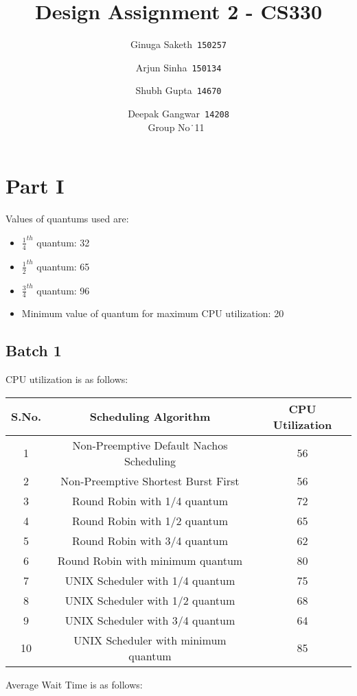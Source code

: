\documentclass[]{article}
\title{Design Assignment 2 - CS330}
\author{
  Ginuga Saketh\      \texttt{150257}
  \and
  Arjun Sinha\      \texttt{150134}
  \and 
  Shubh Gupta\    \texttt{14670}
  \and 
  Deepak Gangwar\  \texttt{14208}\\
  Group No\.\ 11\
}
\begin{document}
\maketitle

\section{Part I}

Values of quantums used are:
\begin{itemize}
\item $\frac{1}{4}^{th}$ quantum: 32
\item $\frac{1}{2}^{th}$ quantum: 65
\item $\frac{3}{4}^{th}$ quantum: 96
\item Minimum value of quantum for maximum CPU utilization: 20
\end{itemize}
\subsection{Batch 1}

CPU utilization is as follows:

\begin{center}
\begin{tabular}{|c|c|c|}
\hline
S.No. & Scheduling Algorithm & CPU Utilization\\
\hline
1 & Non-Preemptive Default Nachos Scheduling & 56\\
2 & Non-Preemptive Shortest Burst First & 56\\
3 & Round Robin with 1/4 quantum & 72\\
4 & Round Robin with 1/2 quantum & 65\\
5 & Round Robin with 3/4 quantum & 62\\
6 & Round Robin with minimum quantum & 80\\
7 & UNIX Scheduler with 1/4 quantum & 75\\
8 & UNIX Scheduler with 1/2 quantum & 68\\
9 & UNIX Scheduler with 3/4 quantum & 64\\
10 & UNIX Scheduler with minimum quantum & 85\\
\hline
\end{tabular}
\end{center}

Average Wait Time is as follows:
\end{document}
